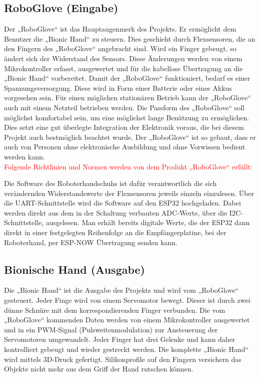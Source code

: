 \documentclass[11pt]{article}
\begin{document}
\subsection{RoboGlove (Eingabe)}
Der „RoboGlove“ ist das Hauptaugenmerk des Projekts. Er ermöglicht dem Benutzer die „Bionic Hand“ zu steuern. 
Dies geschieht durch Flexsensoren, die an den Fingern des „RoboGlove“ angebracht sind. Wird ein Finger gebeugt, 
so ändert sich der Widerstand des Sensors. Diese Änderungen werden von einem Mikrokontroller erfasst, ausgewertet 
und für die kabellose Übertragung an die „Bionic Hand“ vorbereitet. Damit der „RoboGlove“ funktioniert, bedarf es 
einer Spannungsversorgung. Diese wird in Form einer Batterie oder eines Akkus vorgesehen sein. Für einen möglichen 
stationären Betrieb kann der „RoboGlove“ auch mit einem Netzteil betrieben werden. Die Passform des „RoboGlove“ soll 
möglichst komfortabel sein, um eine möglichst lange Benützung zu ermöglichen. Dies setzt eine gut überlegte Integration 
der Elektronik voraus, die bei diesem Projekt auch bestmöglich beachtet wurde. Der „RoboGlove“ ist so gebaut, dass er 
auch von Personen ohne elektronische Ausbildung und ohne Vorwissen bedient werden kann.\\

\textcolor{red}{Folgende Richtlinien und Normen werden von dem Produkt „RoboGlove“ erfüllt:}

Die Software des Roboterhandschuhs ist dafür verantwortlich die sich verändernden Widerstandswerte der Flexsensoren 
jeweils einzeln einzulesen. Über die UART-Schnittstelle wird die Software auf den ESP32 hochgeladen. Dabei werden 
direkt aus dem in der Schaltung verbauten ADC-Werte, über die I2C-Schnittstelle, ausgelesen. Man erhält bereits digitale 
Werte, die der ESP32 dann direkt in einer festgelegten Reihenfolge an die Empfängerplatine, bei der Roboterhand, per 
ESP-NOW Übertragung senden kann.

\subsection{Bionische Hand (Ausgabe)}
Die „Bionic Hand“ ist die Ausgabe des Projekts und wird vom „RoboGlove“ gesteuert. Jeder Finge wird von einem Servomotor 
bewegt. Dieser ist durch zwei dünne Schnüre mit dem korrespondierenden Finger verbunden. Die vom „RoboGlove“ kommenden 
Daten werden von einem Mikrokontroller ausgewertet und in ein PWM-Signal (Pulsweitenmodulation) zur Ansteuerung der 
Servomotoren umgewandelt. Jeder Finger hat drei Gelenke und kann daher kontrolliert gebeugt und wieder gestreckt werden. 
Die komplette „Bionic Hand“ wird mittels 3D-Druck gefertigt. Silikonprofile auf den Fingern versichern das Objekte nicht 
mehr aus dem Griff der Hand rutschen können. 
\end{document}
